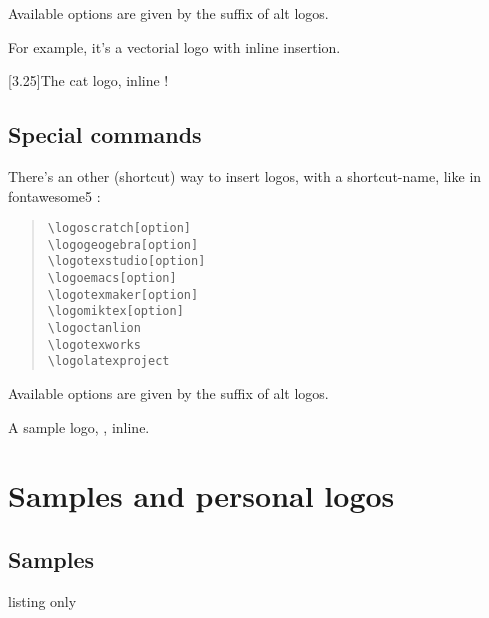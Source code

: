 \documentclass[11pt,a4paper]{ltxdoc}
\begin{document}
Available \textsf{options} are given by the suffix of alt logos.

\begin{tcblisting}{}
{\Large\sffamily For example, it's a vectorial logo  with inline insertion.}
\end{tcblisting}

\begin{tcblisting}{}
\scalebox{3.25}[3.25]{\ttfamily The cat  logo, inline !}
\end{tcblisting}

\subsection{Special commands}

There's an other (shortcut) way to insert logos, with a shortcut-name, like in \textsf{fontawesome5} :

\begin{quote}
\begin{verbatim}
\logoscratch[option]
\logogeogebra[option]
\logotexstudio[option]
\logoemacs[option]
\logotexmaker[option]
\logomiktex[option]
\logoctanlion
\logotexworks
\logolatexproject
\end{verbatim}
\end{quote}

Available options are given by the suffix of alt logos.

\begin{tcblisting}{}
A sample logo, \logoemacs[alt], inline.
\end{tcblisting}

\pagebreak

\section{Samples and personal logos}

\subsection{Samples}

\begin{tcblisting}{listing only}
\newcommand\samplevectorlogo[1]{{\LARGE Inline {#1} logo}\par}
\end{tcblisting}

\newcommand\samplevectorlogo[1]{{\LARGE Inline {#1} logo}\par}
\end{document}
